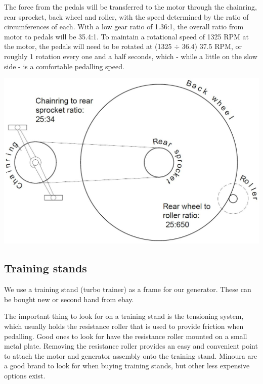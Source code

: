 \documentclass{article}
\theoremstyle{definition}
\theoremstyle{definition}
\theoremstyle{remark}
\begin{document}
    The force from the pedals will be transferred to the motor through the chainring, rear sprocket, back wheel and roller, with the speed determined by the ratio of circumferences of each. With a low gear ratio of 1.36:1, the overall ratio from motor to pedals will be 35.4:1. To maintain a rotational speed of 1325 RPM at the motor, the pedals will need to be rotated at (1325 $\div$ 36.4) 37.5 RPM, or roughly 1 rotation every one and a half seconds, which - while a little on the slow side - is a comfortable pedalling speed.

    \begin{center}
      \includegraphics[width=0.35\paperwidth]{Images/image_3_1_(pedalling_speed).png}
    \end{center}
  

  \subsection{Training stands} %
  \label{sub:training_stands}

    We use a training stand (turbo trainer) as a frame for our generator. These can be bought new or second hand from ebay.

    The important thing to look for on a training stand is the tensioning system, which usually holds the resistance roller that is used to provide friction when pedalling. Good ones to look for have the resistance roller mounted on a small metal plate. Removing the resistance roller provides an easy and convenient point to attach the motor and generator assembly onto the training stand. Minoura are a good brand to look for when buying training stands, but other less expensive options exist.
\end{document}
